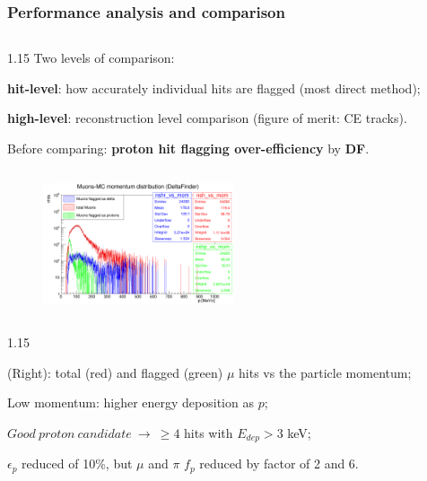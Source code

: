 \documentclass{beamer}
\begin{document}
\begin{frame}
\frametitle{Performance analysis and comparison}
  \begin{columns}
        \begin{column}{1.15\framewidth}
       {\footnotesize Two levels of comparison:}
    \setlength{\leftmargini}{1.2em}
    \begin{itemize}
      {\footnotesize  \item \textbf{hit-level}: how accurately individual hits are flagged (most direct method);
    \item \textbf{high-level}: reconstruction level comparison (figure of merit: CE tracks).
    \vspace{-1mm}
\item Before comparing: \textbf{proton hit flagging over-efficiency} by \textbf{DF}.}
    \end{itemize}
    \end{column}
    \end{columns}
        \vspace{-1mm}
       
        \begin{figure}[!h]
            \centering
            \includegraphics[width =0.5\textwidth]{figures/png/Screenshot_20240805_222923.png}
           \label{fig:0pbarbefore}
        \end{figure}
        
 
    \vspace{-3mm}
    \begin{columns}
        \begin{column}{1.15\framewidth}
    \setlength{\leftmargini}{1.2em}
    \begin{itemize}
      {\footnotesize  
\item (Right): total (red) and flagged (green) $\mu$ hits vs the particle momentum;
\vspace{1mm}
\item Low momentum: higher energy deposition as $p$;
\vspace{1mm}
\item $Good\ proton\ candidate\ \rightarrow\ \geq 4$
hits with $E_{dep} > 3$ keV; 
\item $\epsilon_p$ reduced of 10\%, but $\mu$ and $\pi$ $f_p$ reduced by factor of 2 and 6.
}
      \end{itemize}
      \end{column}
      \end{columns}
\end{frame}
\end{document}

